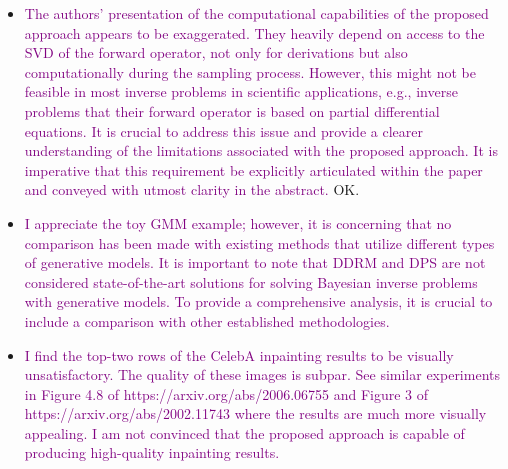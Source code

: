 \documentclass{article}
\newcommand{\question}[1]{\textcolor{purple}{#1}}
\begin{document}
\begin{itemize}
{ to represent the rank of the forward operator, which can easily be mistaken for the concept of a time step in denoising diffusion probabilistic models. As it stands, this paper is incomprehensible and is imperative that the author revises the notation and provides clearer definitions and explanations to facilitate a better understanding of the content. Maybe use a table of notations somewhere in the appendix?} OK.
 \item \question{The authors' presentation of the computational capabilities of the proposed approach appears to be exaggerated. They heavily depend on access to the SVD of the forward operator, not only for derivations but also computationally during the sampling process. However, this might not be feasible in most inverse problems in scientific applications, e.g., inverse problems that their forward operator is based on partial differential equations. It is crucial to address this issue and provide a clearer understanding of the limitations associated with the proposed approach. It is imperative that this requirement be explicitly articulated within the paper and conveyed with utmost clarity in the abstract.} OK.
 \item \question{I appreciate the toy GMM example; however, it is concerning that no comparison has been made with existing methods that utilize different types of generative models. It is important to note that DDRM and DPS are not considered state-of-the-art solutions for solving Bayesian inverse problems with generative models. To provide a comprehensive analysis, it is crucial to include a comparison with other established methodologies.}
 \item \question{I find the top-two rows of the CelebA inpainting results to be visually unsatisfactory. The quality of these images is subpar. See similar experiments in Figure 4.8 of https://arxiv.org/abs/2006.06755 and Figure 3 of https://arxiv.org/abs/2002.11743 where the results are much more visually appealing. I am not convinced that the proposed approach is capable of producing high-quality inpainting results.}
\end{itemize}
\end{document}

